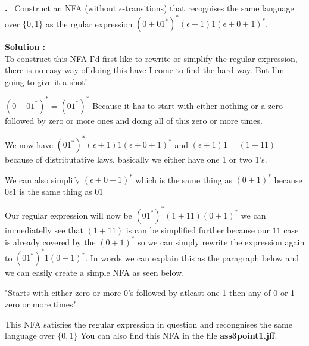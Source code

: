 \documentclass{article}
\newcounter{problem}
\newcounter{solution}
\newcommand\Problem{%
  \stepcounter{problem}%
  \textbf{\theproblem.}~%
  \setcounter{solution}{0}%
}
\newcommand\TheSolution{%
  \textbf{Solution \theproblem:}\\%
}
\begin{document}
\begin{center}
\end{center}

\Problem Construct an NFA (without $\epsilon$-transitions) that recognises the same language 
over $\{0,1\}$ as the rgular expression $(0+01^*)^*(\epsilon+1)1(\epsilon+0+1)^*.$ 

\TheSolution To construct this NFA I'd first like to rewrite or simplify the regular expression, there
is no easy way of doing this have I come to find the hard way. But I'm going to give it a shot!

$(0+01^*)^* = (01^*)^*$ Because it has to start with either nothing or a zero followed by zero or more ones
and doing all of this zero or more times.

We now have $(01^*)^*(\epsilon+1)1(\epsilon+0+1)^*$ and $(\epsilon+1)1 = (1+11)$ because of distributative 
laws, basically we either have one 1 or two 1's.

We can also simplify $(\epsilon+0+1)^*$ which is the same thing as $(0+1)^*$ because $0\epsilon1$ is the same 
thing as $01$

Our regular expression will now be $(01^*)^*(1+11)(0+1)^*$ we can immediatelly see that $(1+11)$ is can be 
simplified further because our $11$ case is already covered by the $(0+1)^*$ so we can simply rewrite the 
expression again to $(01^*)^*1(0+1)^*$. In words we can explain this as the paragraph below and we can easily 
create a simple NFA as seen below.
\begin{center}
  "Starts with either zero or more 0's followed by atleast one 1 then any of 0 or 1 zero or more times"
\end{center}

\begin{center}
\end{center}

This NFA satisfies the regular expression in question and recongnises the same language over $\{0,1\}$
You can also find this NFA in the file \textbf{ass3point1.jff}.
\end{document}
